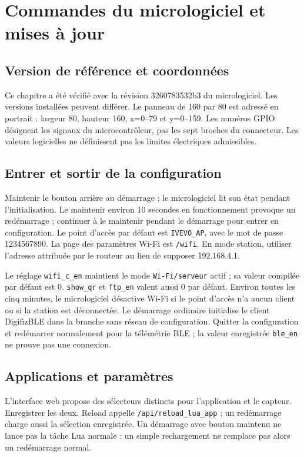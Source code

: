 \chapter{Commandes du micrologiciel et mises à jour}\label{ch:firmware}
\section{Version de référence et coordonnées}
Ce chapitre a été vérifié avec la révision 3260783532b3 du micrologiciel. Les versions installées peuvent différer. Le panneau de 160 par 80 est adressé en portrait : largeur 80, hauteur 160, x=0–79 et y=0–159. Les numéros GPIO désignent les signaux du microcontrôleur, pas les sept broches du connecteur. Les valeurs logicielles ne définissent pas les limites électriques admissibles.

\section{Entrer et sortir de la configuration}
Maintenir le bouton arrière au démarrage ; le micrologiciel lit son état pendant l'initialisation. Le maintenir environ 10 secondes en fonctionnement provoque un redémarrage ; continuer à le maintenir pendant le démarrage pour entrer en configuration. Le point d'accès par défaut est \nolinkurl{IVEVO_AP}, avec le mot de passe 1234567890. La page des paramètres Wi-Fi est \nolinkurl{/wifi}. En mode station, utiliser l'adresse attribuée par le routeur au lieu de supposer 192.168.4.1.

Le réglage \nolinkurl{wifi_c_en} maintient le mode \nolinkurl{Wi-Fi/serveur} actif ; sa valeur compilée par défaut est 0. \nolinkurl{show_qr} et \nolinkurl{ftp_en} valent aussi 0 par défaut. Environ toutes les cinq minutes, le micrologiciel désactive Wi-Fi si le point d'accès n'a aucun client ou si la station est déconnectée. Le démarrage ordinaire initialise le client DigifizBLE dans la branche sans réseau de configuration. Quitter la configuration et redémarrer normalement pour la télémétrie BLE ; la valeur enregistrée \nolinkurl{ble_en} ne prouve pas une connexion.

\section{Applications et paramètres}
L'interface web propose des sélecteurs distincts pour l'application et le capteur. Enregistrer les deux. Reload appelle \nolinkurl{/api/reload_lua_app} ; un redémarrage charge aussi la sélection enregistrée. Un démarrage avec bouton maintenu ne lance pas la tâche Lua normale : un simple rechargement ne remplace pas alors un redémarrage normal.


